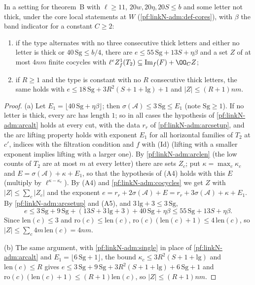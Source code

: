 \begin{proposition}\label{pf:linkN-adm:sumalt}
In a setting for theorem~B with $\ell\ge11$, $20w,20\eta,20S\le b$ and some letter not thick, under the core local
statements at $W$ (\cref{pf:linkN-adm:def-cores}), with $\beta$ the band indicator for a constant $C\ge2$:
\begin{enumerate}[label=(\alph*)]
\item if the type alternates with no three consecutive thick letters and either no letter is thick or
  $40\,\mathrm{Sg}\le b/4$, there are $e\le55\,\mathrm{Sg}+13S+\eta\beta$ and a set $Z$ of at most $4nm$ finite cocycles with
  $\ell^e\linkNadmZf(T_2)\subseteq\linkNadmIm(F)+\OO_CZ$;
\item if $R\ge1$ and the type is constant with no $R$ consecutive thick letters, the same holds with
  $e\le18\,\mathrm{Sg}+3R^2(S+1+\mathrm{lg})+1$ and $|Z|\le(R+1)nm$.
\end{enumerate}
\end{proposition}

\begin{proof}
(a) Let $E_1=\lfloor40\,\mathrm{Sg}+\eta\beta\rfloor$; then $\sigma(\mathcal A)\le3\,\mathrm{Sg}\le E_1$ (note $\mathrm{Sg}\ge1$). If no
letter is thick, every arc has length $1$; so in all cases the hypothesis of \cref{pf:linkN-adm:arcalt} holds at every
cut, with the data $r_r$ of \cref{pf:linkN-adm:arcsetup}, and the arc lifting property holds with exponent $E_1$ for all
horizontal families of $T_2$ at $c'$, indices with the filtration condition and $f$ with (Id) (lifting with a smaller
exponent implies lifting with a larger one). By \cref{pf:linkN-adm:arclen} (the low counts of $T_2$ are at most $m$ at every
letter) there are sets $Z_c$; put $\kappa=\max_c\kappa_c$ and $E=\sigma(\mathcal A)+\kappa+E_1$, so that the hypothesis of (A4) holds with this $E$
(multiply by $\ell^{\kappa-\kappa_c}$). By (A4) and \cref{pf:linkN-adm:cocycles} we get $Z$ with $|Z|\le\sum_c|Z_c|$ and the
exponent $e=r_r+2\sigma(\mathcal A)+E=r_r+3\sigma(\mathcal A)+\kappa+E_1$. By \cref{pf:linkN-adm:arcsetup} and (A5), and $3\,\mathrm{lg}+3\le3\,\mathrm{Sg}$,
\[
e\le3\,\mathrm{Sg}+9\,\mathrm{Sg}+(13S+3\,\mathrm{lg}+3)+40\,\mathrm{Sg}+\eta\beta\le55\,\mathrm{Sg}+13S+\eta\beta .
\]
Since $\mathrm{len}(c)\le3$ and $\mathrm{ro}(c)\le\mathrm{len}(c)$, $\mathrm{ro}(c)(\mathrm{len}(c)+1)\le4\,\mathrm{len}(c)$, so
$|Z|\le\sum_c4m\,\mathrm{len}(c)=4nm$.

(b) The same argument, with \cref{pf:linkN-adm:single} in place of \cref{pf:linkN-adm:arcalt} and $E_1=\lfloor6\,\mathrm{Sg}+1\rfloor$, the bound $\kappa_c\le3R^2(S+1+\mathrm{lg})$ and
$\mathrm{len}(c)\le R$ gives $e\le3\,\mathrm{Sg}+9\,\mathrm{Sg}+3R^2(S+1+\mathrm{lg})+6\,\mathrm{Sg}+1$ and
$\mathrm{ro}(c)(\mathrm{len}(c)+1)\le(R+1)\mathrm{len}(c)$, so $|Z|\le(R+1)nm$.
\end{proof}

